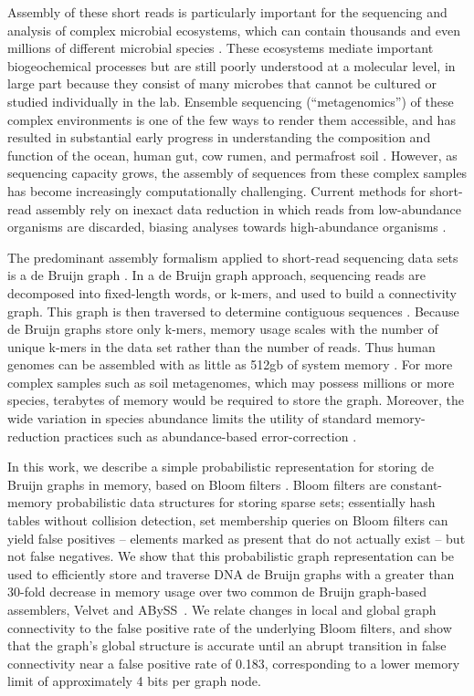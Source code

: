 \documentclass{pnastwo}
\begin{document}
\begin{article}
Assembly of these short reads is particularly important for the sequencing
and analysis of complex microbial ecosystems, which can contain
thousands and even millions of different microbial species \cite{pubmed16123304}.  These
ecosystems mediate important biogeochemical processes but are still
poorly understood at a molecular level, in large part because they
consist of many microbes that cannot be cultured or studied
individually in the lab.  Ensemble sequencing (``metagenomics'') of
these complex environments is one of the few ways to render them
accessible, and has resulted in substantial early progress in
understanding the composition and function of the ocean, human gut, cow
rumen, and permafrost soil \cite{sargasso,metahit,rumen,permafrost}.  However, as sequencing capacity grows,
the assembly of sequences from these complex samples has become
increasingly computationally challenging.  Current methods for short-read assembly rely on
inexact data reduction in which reads from low-abundance organisms are
discarded, biasing analyses towards high-abundance organisms \cite{metahit,rumen,permafrost}.

The predominant assembly formalism applied to short-read sequencing
data sets is a de Bruijn graph \cite{pubmed11504945,pubmed20211242,pubmed22068540}.
In a de Bruijn graph approach, sequencing reads are decomposed into
fixed-length words, or k-mers, and used to build a connectivity graph.
This graph is then traversed to determine contiguous sequences
\cite{pubmed22068540}.  Because de Bruijn graphs store only k-mers,
memory usage scales with the number of unique k-mers in the data set
rather than the number of reads.  Thus human genomes can be assembled
with as little as 512gb of system memory \cite{pmid21187386}.  For more
complex samples such as soil metagenomes, which may possess millions
or more species, terabytes of memory would be required to store the graph.  Moreover, the wide variation in species abundance
limits the utility of standard memory-reduction practices such as
abundance-based error-correction \cite{pubmed21114842}.

In this work, we describe a simple probabilistic representation for
storing de Bruijn graphs in memory, based on Bloom filters
\cite{bloom}.  Bloom filters are constant-memory probabilistic data
structures for storing sparse sets; essentially hash tables without collision
detection, set membership queries on Bloom filters can yield false
positives -- elements marked as present that do not actually exist --
but not false negatives.  We show that this probabilistic graph
representation can be used to efficiently store and traverse DNA de
Bruijn graphs with a greater than 30-fold decrease in memory usage
over two common de Bruijn graph-based assemblers, Velvet
and ABySS~\cite{velvet,abyss}. We relate 
changes in local and
global graph connectivity to the false positive rate of the underlying
Bloom filters, and show that the graph's global structure is accurate
until an abrupt transition in false connectivity near a false positive
rate of 0.183, corresponding to a lower memory limit of approximately
4 bits per graph node.


\end{article}
\end{document}
